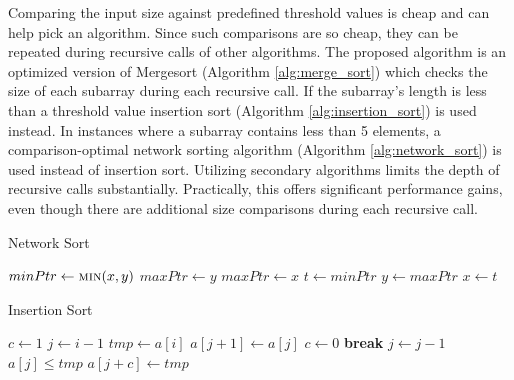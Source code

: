 \documentclass[12pt, conference]{ieeeconf}
\begin{document}
Comparing the input size against predefined threshold values is cheap and can
help pick an algorithm. Since such comparisons are so cheap, they can be
repeated during recursive calls of other algorithms. The proposed algorithm is
an optimized version of Mergesort (Algorithm \ref{alg:merge_sort}) which checks
the size of each subarray during each recursive call. If the subarray's length
is less than a threshold value insertion sort (Algorithm
\ref{alg:insertion_sort}) is used instead. In instances where a subarray
contains less than 5 elements, a comparison-optimal network sorting algorithm
(Algorithm \ref{alg:network_sort}) is used instead of insertion sort. Utilizing
secondary algorithms limits the depth of recursive calls substantially.
Practically, this offers significant performance gains, even though there are
additional size comparisons during each recursive
call\parencite{the_basic_algorithms}.

\begin{algorithm}[H]
	\caption{Network Sort}
	\label{alg:network_sort}
	\begin{algorithmic}
		\State $minPtr \gets \Call{min}{x, y}$
		\State $maxPtr \gets y$
		\Else
		\State $maxPtr \gets x$
		\EndIf
		\State $t \gets minPtr$
		\State $y \gets maxPtr$
		\State $x \gets t$
		\EndProcedure

		\State {}
		\State {}
		\State {}
		\EndProcedure

		\State {}
		\State {}
		\State {}
		\State {}
		\State {}
		\EndProcedure
	\end{algorithmic}
\end{algorithm}

\begin{algorithm}[H]
	\caption{Insertion Sort}
	\label{alg:insertion_sort}
	\begin{algorithmic}
		\Procedure{INS\_SORT}{a, n}
		\For {$i \gets 1$ to $n$}
		\State $c \gets 1$
		\State $j \gets i - 1$
		\If {$a[j] > a[i]$}
		\State $tmp \gets a[i]$
		\Repeat
		\State $a[j + 1] \gets a[j]$
		\If {$j = 0$}
		\State $c \gets 0$
		\State \textbf{break}
		\EndIf
		\State $j \gets j - 1$
		\Until $a[j] \le tmp$
		\State $a[j + c] \gets tmp$
		\EndIf
		\EndFor
		\EndProcedure
	\end{algorithmic}
\end{algorithm}
\end{document}
